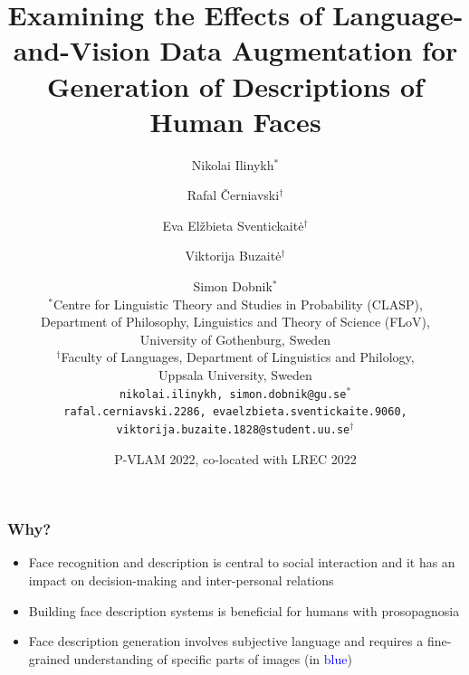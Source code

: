 \documentclass[aspectratio=1610]{beamer} %
\title{Examining the Effects of Language-and-Vision Data Augmentation for Generation of Descriptions of Human Faces}
\author{
Nikolai Ilinykh$^{\ast}$ \and Rafal Černiavski$^{\dagger}$ \and Eva Elžbieta Sventickaitė$^{\dagger}$ \\ \and Viktorija Buzaitė$^{\dagger}$ \and Simon Dobnik$^{\ast}$ \\
	\vspace{.2cm}
        \small $^{\ast}$Centre for Linguistic Theory and Studies in Probability (CLASP), \\
        Department of Philosophy, Linguistics and Theory of Science (FLoV), \\
        University of Gothenburg, Sweden \\
	$^{\dagger}$Faculty of Languages, Department of Linguistics and Philology, \\ Uppsala University, Sweden \\
	\vspace{.2cm}
	\texttt{nikolai.ilinykh, simon.dobnik@gu.se}$^{\ast}$ \\
	\texttt{rafal.cerniavski.2286, evaelzbieta.sventickaite.9060, viktorija.buzaite.1828@student.uu.se}$^{\dagger}$ \\
      }
\date{P-VLAM 2022, co-located with LREC 2022}
\begin{document}
\frame[plain]{\titlepage}



\begin{frame}
\frametitle{Why?}

\begin{itemize}

\vspace{.7cm}

\item Face recognition and description is central to social interaction and it has an impact on decision-making and inter-personal relations
\pause
\item Building face description systems is beneficial for humans with prosopagnosia
\pause
\item Face description generation involves subjective language and requires a fine-grained understanding of specific parts of images (in \textcolor{blue}{blue})

\end{itemize}


\end{frame}
\end{document}
